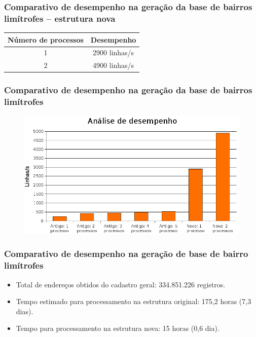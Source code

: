 \documentclass{beamer}
\begin{document}
\frame
{
  \frametitle{Comparativo de desempenho na gera\c{c}\~ao da base de bairros lim\'itrofes -- estrutura nova}

  \begin{center}
    \begin{tabular}{c|c}
      \hline
      N\'umero de processos & Desempenho\\
      \hline
      1 & 2900 linhas/s\\
      2 & 4900 linhas/s\\
      \hline      
    \end{tabular}
  \end{center}
}

\frame
{
  \frametitle{Comparativo de desempenho na gera\c{c}\~ao da base de bairros lim\'itrofes}

  \begin{figure}[h]
    \centering
    \includegraphics [scale=0.35,]{grafico.png}
  \end{figure}
}

\frame
{
  \frametitle{Comparativo de desempenho na gera\c{c}\~ao de base de bairro lim\'itrofes}

  \begin{itemize}[<+->]
    \item Total de endere\c{c}os obtidos do cadastro geral: 334.851.226 registros.
    \item Tempo estimado para processamento na estrutura original: 175,2 horas (7,3 dias).
    \item Tempo para processamento na estrutura nova: 15 horas (0,6 dia).
  \end{itemize}
}
\end{document}
